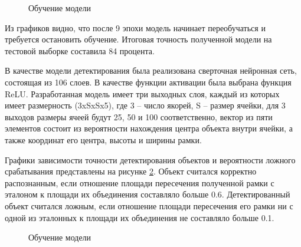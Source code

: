 \begin{figure}[H]
	\begin{center}
		\caption{Обучение модели}
		\label{img:model_training}
	\end{center}
\end{figure}

Из графиков видно, что после 9 эпохи модель начинает переобучаться и требуется остановить обучение. Итоговая точность полученной модели на тестовой выборке составила 84 процента.

В качестве модели детектирования была реализована сверточная нейронная сеть, состоящая из 106 слоев. В качестве функции активации была выбрана функция ReLU. Разработанная модель имеет три выходных слоя, каждый из которых имеет размерность (3xSxSx5), где 3 -- число якорей, S -- размер ячейки, для 3 выходов размеры ячеей будут 25, 50 и 100 соответственно, вектор из пяти элементов состоит из вероятности нахождения центра объекта внутри ячейки, а также координат его центра, высоты и ширины рамки.

Графики зависимости точности детектирования объектов и вероятности ложного срабатывания представлены на рисунке \ref{img:yolo_training}. Объект считался корректно распознанным, если отношение площади пересечения полученной рамки с эталоном к площади их объединения составляло больше 0.6. Детектированный объект считался ложным, если отношение площади пересечения его рамки ни с одной из эталонных к площади их объединения не составляло больше 0.1.

\begin{figure}[H]
	\begin{center}
		\caption{Обучение модели}
		\label{img:yolo_training}
	\end{center}
\end{figure}


